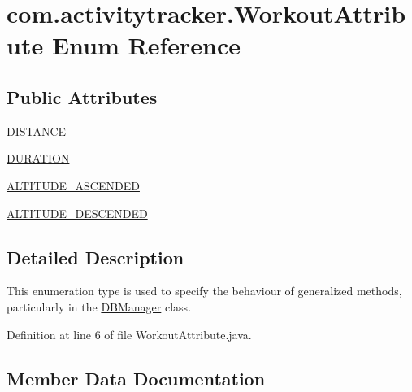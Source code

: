 \hypertarget{enumcom_1_1activitytracker_1_1_workout_attribute}{}\section{com.\+activitytracker.\+Workout\+Attribute Enum Reference}
\label{enumcom_1_1activitytracker_1_1_workout_attribute}
\subsection*{Public Attributes}
\begin{DoxyCompactItemize}
\item 
\mbox{\hyperlink{enumcom_1_1activitytracker_1_1_workout_attribute_a9df78b53c3bb12809b5f6eff60b88c71}{D\+I\+S\+T\+A\+N\+CE}}
\item 
\mbox{\hyperlink{enumcom_1_1activitytracker_1_1_workout_attribute_a26bf4a418622c817101083d0152b1cce}{D\+U\+R\+A\+T\+I\+ON}}
\item 
\mbox{\hyperlink{enumcom_1_1activitytracker_1_1_workout_attribute_a6b40f235f8d0a5b9d751db7c8375dfe1}{A\+L\+T\+I\+T\+U\+D\+E\+\_\+\+A\+S\+C\+E\+N\+D\+ED}}
\item 
\mbox{\hyperlink{enumcom_1_1activitytracker_1_1_workout_attribute_a1aec2c32feb3bab1e6501d3b80079b88}{A\+L\+T\+I\+T\+U\+D\+E\+\_\+\+D\+E\+S\+C\+E\+N\+D\+ED}}
\end{DoxyCompactItemize}


\subsection{Detailed Description}
This enumeration type is used to specify the behaviour of generalized methods, particularly in the \mbox{\hyperlink{classcom_1_1activitytracker_1_1_d_b_manager}{D\+B\+Manager}} class. 

Definition at line 6 of file Workout\+Attribute.\+java.



\subsection{Member Data Documentation}
\mbox{\label{enumcom_1_1activitytracker_1_1_workout_attribute_a6b40f235f8d0a5b9d751db7c8375dfe1}} 
